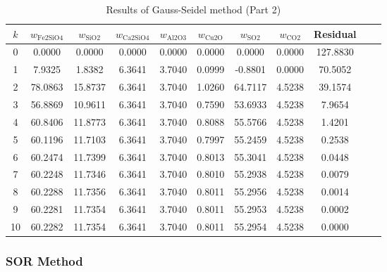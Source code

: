 \documentclass[10pt]{article}
\begin{document}
\begin{table}[H]
\centering
\caption{Results of Gauss-Seidel method (Part 2)}
\begin{tabular}{ccccccccccc}
\toprule
\( k \) & \( w_{\text{Fe2SiO4}} \) & \( w_{\text{SiO2}} \) & \( w_{\text{Ca2SiO4}} \) & \( w_{\text{Al2O3}} \) & \( w_{\text{Cu2O}} \) & \( w_{\text{SO2}} \) & \( w_{\text{CO2}} \) & Residual \\
\midrule
0 & 0.0000 & 0.0000 & 0.0000 & 0.0000 & 0.0000 & 0.0000 & 0.0000 & 127.8830 \\
1 & 7.9325 & 1.8382 & 6.3641 & 3.7040 & 0.0999 & -0.8801 & 0.0000 & 70.5052 \\
2 & 78.0863 & 15.8737 & 6.3641 & 3.7040 & 1.0260 & 64.7117 & 4.5238 & 39.1574 \\
3 & 56.8869 & 10.9611 & 6.3641 & 3.7040 & 0.7590 & 53.6933 & 4.5238 & 7.9654 \\
4 & 60.8406 & 11.8773 & 6.3641 & 3.7040 & 0.8088 & 55.5766 & 4.5238 & 1.4201 \\
5 & 60.1196 & 11.7103 & 6.3641 & 3.7040 & 0.7997 & 55.2459 & 4.5238 & 0.2538 \\
6 & 60.2474 & 11.7399 & 6.3641 & 3.7040 & 0.8013 & 55.3041 & 4.5238 & 0.0448 \\
7 & 60.2248 & 11.7346 & 6.3641 & 3.7040 & 0.8010 & 55.2938 & 4.5238 & 0.0079 \\
8 & 60.2288 & 11.7356 & 6.3641 & 3.7040 & 0.8011 & 55.2956 & 4.5238 & 0.0014 \\
9 & 60.2281 & 11.7354 & 6.3641 & 3.7040 & 0.8011 & 55.2953 & 4.5238 & 0.0002 \\
10 & 60.2282 & 11.7354 & 6.3641 & 3.7040 & 0.8011 & 55.2954 & 4.5238 & 0.0000 \\
\bottomrule
\end{tabular}
\end{table}



\subsubsection{SOR Method}
\end{document}
